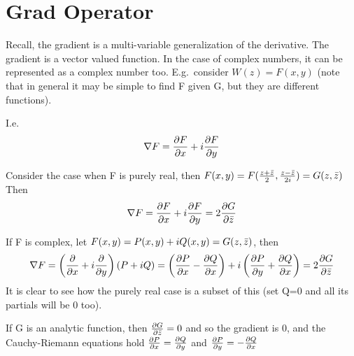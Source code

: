 \section{Grad Operator}
Recall, the gradient is a multi-variable  generalization of the derivative. The
gradient is a vector valued function. In the case of complex numbers, it can be
represented as a complex number too. E.g.\ consider $W(z) = F(x,y)$ (note that
in general it may be simple to find F given G, but they are different
functions).

I.e. 
$$\nabla F = \frac{\partial F}{\partial x} + i \frac{\partial F}{\partial y}$$

Consider the case when F is purely real, then 
$F(x,y) = F(\frac{z+\bar{z}}{2},\frac{z-\bar{z}}{2i}) = G(z,\bar{z})$
Then
$$\nabla F = \frac{\partial F}{\partial x} + i \frac{\partial F}{\partial y} = 2\frac{\partial G}{\partial \bar{z}}$$

If F is complex, let $F(x,y) = P(x,y) + iQ(x,y) = G(z,\bar{z})$, then
$$\nabla F = \left(\frac{\partial }{\partial x} + i \frac{\partial }{\partial y}\right)(P+iQ) 
           = \left(\frac{\partial P}{\partial x} - \frac{\partial Q}{\partial x}\right) + 
                i\left(\frac{\partial P}{\partial y} + \frac{\partial Q}{\partial x}\right) 
           = 2\frac{\partial G}{\partial \bar{z}}$$
It is clear to see how the purely real case is a subset of this (set Q=0 and
all its partials will be 0 too).

If G is an analytic function, then $\frac{\partial G}{\partial \bar{z}} = 0$ and so the gradient
is 0, and the Cauchy-Riemann equations hold $\frac{\partial P}{\partial x}=\frac{\partial Q}{\partial y}$ and 
$\frac{\partial P}{\partial y}=-\frac{\partial Q}{\partial x}$






